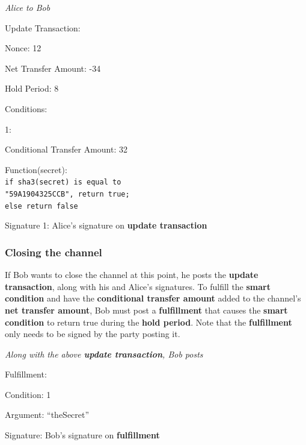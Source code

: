 \documentclass[a4paper]{article}
\newcommand{\bgls}[1]{\textbf{\gls{#1}}}
\newenvironment{mydescription}
{\begin{description}
\setlength{\itemsep}{5pt}
  \setlength{\parskip}{0pt}
  \setlength{\labelsep}{5pt}
}{
\end{description}}
\begin{document}
\begin{mdframed}[style=message]{\emph{Alice to Bob}}
\begin{mydescription}
\item[Update Transaction:] \hfill
  \begin{mydescription}
    \item[Nonce:] 12
    \item[Net Transfer Amount:] -34
    \item[Hold Period:] 8
    \item[Conditions:] \hfill
      \begin{mydescription}
        \item[1:] \hfill
          \begin{mydescription}
            \item[Conditional Transfer Amount:] 32
            \item[Function(secret):] \texttt{\\ if sha3(secret) is equal to\\ "59A1904325CCB", return true;\\ else return false}
  \end{mydescription}
    \end{mydescription}
  \end{mydescription}
\item[Signature 1:] Alice's signature on \bgls{update transaction}
\end{mydescription}
\end{mdframed}

\subsubsection{Closing the channel}

If Bob wants to close the channel at this point, he posts the \bgls{update transaction}, along with his and Alice's signatures. To fulfill the \bgls{smart condition} and have the \bgls{conditional transfer amount} added to the channel's \bgls{net transfer amount}, Bob must post a \bgls{fulfillment} that causes the \bgls{smart condition} to return true during the \bgls{hold period}. Note that the \bgls{fulfillment} only needs to be signed by the party posting it.

\begin{mdframed}[style=message]{\emph{Along with the above \bgls{update transaction}, Bob posts}}
\begin{mydescription}
  \item[Fulfillment:] \hfill \begin{mydescription}
    \item[Condition:] 1
    \item[Argument:] ``theSecret''
  \end{mydescription}
  \item[Signature:] Bob's signature on \bgls{fulfillment}
\end{mydescription}
\end{mdframed}
\end{document}
